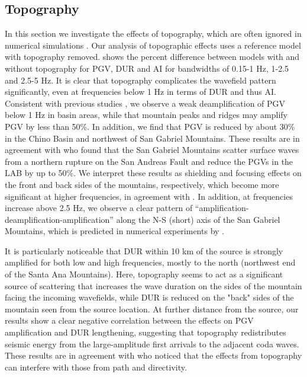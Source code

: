 \subsection{Topography}
In this section we investigate the effects of topography, which are often ignored in numerical simulations . Our analysis of topographic effects uses a reference model with topography removed.
 shows the percent difference between models with and without topography for PGV, DUR and AI for bandwidths of 0.15-1 Hz, 1-2.5 and 2.5-5 Hz. It is clear that topography complicates the wavefield pattern significantly, even at frequencies below 1 Hz in terms of DUR and thus AI. Consistent with previous studies , we observe a weak deamplification of PGV below 1 Hz in basin areas, while that mountain peaks and ridges may amplify PGV by less than 50\%. In addition, we find that PGV is reduced by about 30\% in the Chino Basin and northwest of San Gabriel Mountains. These results are in agreement with \citet{maEffectsLargeScaleSurface2007} who found that the San Gabriel Mountains scatter surface waves from a northern rupture on the San Andreas Fault and reduce the PGVs in the LAB by up to 50\%. We interpret these results as shielding and focusing effects on the front and back sides of the mountains, respectively, which become more significant at higher frequencies, in agreement with \citet{liuScatteringSeismicWaves2020}. In addition, at frequencies increase above 2.5 Hz, we observe a clear pattern of “amplification-deamplification-amplification” along the N-S (short) axis of the San Gabriel Mountains, which is predicted in numerical experiments by \citet{liuScatteringSeismicWaves2020}.

It is particularly noticeable that DUR within 10 km of the source is strongly amplified for both low and high frequencies, mostly to the north (northwest end of the Santa Ana Mountains). Here, topography seems to act as a significant source of scattering that increases the wave duration on the sides of the mountain facing the incoming wavefields, while DUR is reduced on the "back" sides of the mountain seen from the source location. At further distance from the source, our results show a clear negative correlation between the effects on PGV amplification and DUR lengthening, suggesting that topography redistributes seismic energy from the large-amplitude first arrivals to the adjacent coda waves. These results are in agreement with \citet{leeEffectsRealisticSurface2009} who noticed that the effects from topography can interfere with those from path and directivity.



